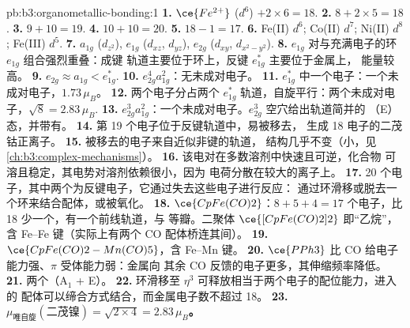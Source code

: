 \begin{solution}{pb:b3:organometallic-bonding:1}
\textbf{1.} $\ce{Fe^{2+}}$ ($d^6$) $+ 2 \times 6 = 18$.
\textbf{2.} $8 + 2 \times 5 = 18$.
\textbf{3.} $9 + 10 = 19$.
\textbf{4.} $10 + 10 = 20$.
\textbf{5.} $18 - 1 = 17$.
\textbf{6.} Fe(II) $d^6$; Co(II) $d^7$; Ni(II) $d^8$; Fe(III) $d^5$.
\textbf{7.} $a_{1g}$ ($d_{z^2}$), $e_{1g}$ ($d_{xz}$, $d_{yz}$), $e_{2g}$ ($d_{xy}$, $d_{x^2-y^2}$).
\textbf{8.} $e_{1g}$ 对与充满电子的环 $e_{1g}$ 组合强烈重叠：成键
轨道主要位于环上，反键 $e_{1g}^\ast$ 主要位于金属上，
能量较高。
\textbf{9.} $e_{2g} \approx a_{1g} < e_{1g}^\ast$.
\textbf{10.} $e_{2g}^4a_{1g}^2$：无未成对电子。
\textbf{11.} $e_{1g}^\ast$ 中一个电子：一个未成对电子，$1.73\,\mu_B$。
\textbf{12.} 两个电子分占两个 $e_{1g}^\ast$ 轨道，自旋平行：两个未成对电子，$\sqrt{8} =
2.83\,\mu_B$.
\textbf{13.} $e_{2g}^3a_{1g}^2$：一个未成对电子。$e_{2g}^3$ 空穴给出轨道简并的
（E）态，并带有。
\textbf{14.} 第 19 个电子位于反键轨道中，易被移去，
生成 18 电子的二茂钴正离子。
\textbf{15.} 被移去的电子来自近似非键的轨道，
结构几乎不变（小，见\cref{ch:b3:complex-mechanisms}）。
\textbf{16.} 该电对在多数溶剂中快速且可逆，化合物
可溶且稳定，其电势对溶剂依赖很小，因为
电荷分散在较大的离子上。
\textbf{17.} 20 个电子，其中两个为反键电子，它通过失去这些电子进行反应：
通过环滑移或脱去一个环来结合配体，或被氧化。
\textbf{18.} $\ce{CpFe(CO)2}$：$8 + 5 + 4 = 17$ 个电子，比 18 少一个，有一个前线轨道，与
 等瓣。二聚体 $\ce{[CpFe(CO)2]2}$ 即“乙烷”，含 Fe--Fe 键（实际上有两个 CO
配体桥连其间）。
\textbf{19.} $\ce{CpFe(CO)2-Mn(CO)5}$，含 Fe--Mn 键。
\textbf{20.} $\ce{PPh3}$ 比 CO 给电子能力强、$\pi$ 受体能力弱：金属向
其余 CO 反馈的电子更多，其伸缩频率降低。
\textbf{21.} 两个（A$_1$ + E）。
\textbf{22.} 环滑移至 $\eta^3$ 可释放相当于两个电子的配位能力，进入的
配体可以缔合方式结合，而金属电子数不超过 18。
\textbf{23.} \textbf{$\mu_{\text{唯自旋}}(\text{二茂镍}) = \sqrt{2 \times 4} = 2.83\,\mu_B$。}
\end{solution}
